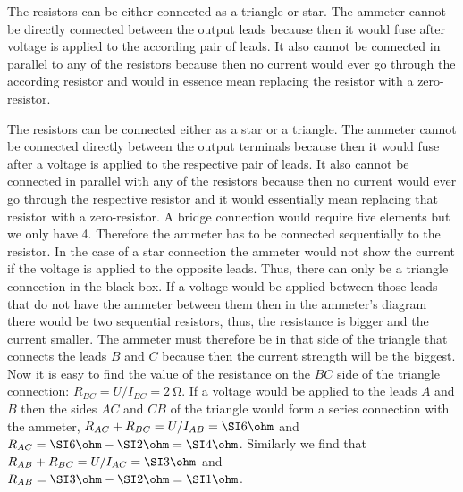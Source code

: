 {\ifEngHint
The resistors can be either connected as a triangle or star. The ammeter cannot be directly connected between the output leads because then it would fuse after voltage is applied to the according pair of leads. It also cannot be connected in parallel to any of the resistors because then no current would ever go through the according resistor and would in essence mean replacing the resistor with a zero-resistor.
\fi


\ifEngSolution
The resistors can be connected either as a star or a triangle. The ammeter cannot be connected directly between the output terminals because then it would fuse after a voltage is applied to the respective pair of leads. It also cannot be connected in parallel with any of the resistors because then no current would ever go through the respective resistor and it would essentially mean replacing that resistor with a zero-resistor. A bridge connection would require five elements but we only have 4. Therefore the ammeter has to be connected sequentially to the resistor. In the case of a star connection the ammeter would not show the current if the voltage is applied to the opposite leads. Thus, there can only be a triangle connection in the black box. If a voltage would be applied between those leads that do not have the ammeter between them then in the ammeter’s diagram there would be two sequential resistors, thus, the resistance is bigger and the current smaller. The ammeter must therefore be in that side of the triangle that connects the leads $B$ and $C$ because then the current strength will be the biggest. Now it is easy to find the value of the resistance on the $BC$ side of the triangle connection: $R_{BC}=U/I_{BC}=\SI{2}{\ohm}$. If a voltage would be applied to the leads $A$ and $B$ then the sides $AC$ and $CB$ of the triangle would form a series connection with the ammeter, $R_{AC}+R_{BC}=U/I_{AB}=\SI 6\ohm$ and $R_{AC}=\SI 6\ohm-\SI 2\ohm=\SI 4\ohm$. Similarly we find that $R_{AB}+R_{BC}=U/I_{AC}=\SI 3\ohm$ and $R_{AB}=\SI 3\ohm-\SI 2\ohm=\SI 1\ohm$.
\fi
}